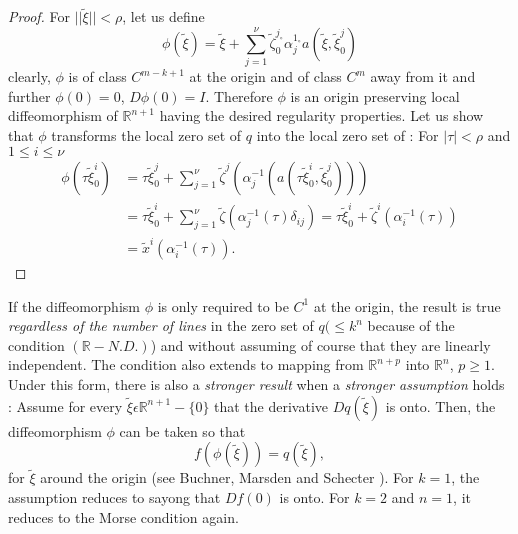 \begin{proof}
For $||\widetilde{\xi}|| < \rho$, let us define
$$
\phi(\widetilde{\xi}) = \widetilde{\xi} + \sum\limits_{j=1}^{\nu}
\widetilde{\zeta}_{0}^{j_{\circ}} \alpha_{j}^{1_{\circ}}
a(\widetilde{\xi}, \widetilde{\xi}_{0}^{j})
$$
clearly, $\phi$ is of class $C^{m-k+1}$ at the origin and of class
$C^{m}$ away from it and further $\phi(0) = 0$, $D\phi(0) =
I$. Therefore $\phi$ is an origin preserving local diffeomorphism of
$\mathbb{R}^{n+1}$ having the desired regularity properties. Let us
show that $\phi$ transforms the local zero set of $q$ into the local
zero set of : For $|\tau| < \rho$ and $1 \leq i \leq \nu$
\begin{align*}
\phi(\tau \widetilde{\xi}_{0}^{i}) & = \tau \widetilde{\xi}_{0}^{j} +
\sum\limits_{j=1}^{\nu} \widetilde{\zeta}^{j} (\alpha_{j}^{-1}(a(\tau
\widetilde{\xi}_{0}^{i}, \widetilde{\xi}_{0}^{j})))\\
& = \tau \widetilde{\xi}_{0}^{i} + \sum\limits_{j=1}^{\nu}
\widetilde{\zeta} (\alpha_{j}^{-1}(\tau) \delta_{ij}) = \tau
\widetilde{\xi}_{0}^{i} + \widetilde{\zeta}^{i} (\alpha_{i}^{-1}
(\tau))\\
& = \widetilde{x}^{i} (\alpha_{i}^{-1} (\tau)).
\end{align*}\pageoriginale
\end{proof}

\begin{comment}\label{chap2-com5.1}
Assume $k = 2$, $n = 1$. Then the condition $(\mathbb{R}-NM.D.)$ is
equivalent to the Morse condition and $\nu = 0$ or $\nu = 2$. In any
case, $\nu \leq n + 1 = 2$ and, if $\nu = 2$, the two lines are
distinct. Thus, they are linearly independent and Theorem
\ref{chap2-thm5.1} coincides with the ``strong'' version of the Morse
lemma (Theorem \ref{chap1-thm3.1} of Chapter \ref{chap1}).
\end{comment}

\begin{remark}\label{chap2-rem5.1}
If the diffeomorphism $\phi$ is only required to be $C^{1}$ at the
origin, the result is true {\em regardless of the number of lines} in
the zero set of $q(\leq k^{n}$ because of the condition
$(\mathbb{R}-N.D.)$) and without assuming of course that they are
linearly independent. The condition also extends to mapping from
$\mathbb{R}^{n+p}$ into $\mathbb{R}^{n}$, $p \geq 1$. Under this form,
there is also a {\em stronger result} when a {\em stronger assumption}
holds : Assume for every $\widetilde{\xi} \epsilon \mathbb{R}^{n+1} -
\{0\}$ that the derivative $Dq(\widetilde{\xi})$ is onto. Then, the
diffeomorphism $\phi$ can be taken so that
$$
f(\phi(\widetilde{\xi})) = q(\widetilde{\xi}),
$$ 
for $\widetilde{\xi}$ around the origin (see Buchner, Marsden and
Schecter \cite{5}). For $k = 1$, the assumption reduces to sayong that
$Df(0)$ is onto. For $k = 2$ and $n = 1$, it reduces to the Morse
condition again.
\end{remark}


